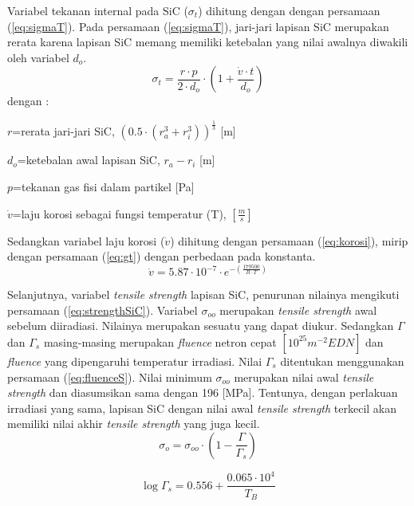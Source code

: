 \documentclass[a4paper,11pt]{report}
\begin{document}
Variabel tekanan internal pada SiC ($\sigma_t$) dihitung dengan dengan persamaan (\ref{eq:sigmaT}). Pada persamaan (\ref{eq:sigmaT}), jari-jari lapisan SiC merupakan rerata karena lapisan SiC memang memiliki ketebalan yang nilai awalnya diwakili oleh variabel $d_o$.
\begin{equation}
  \sigma_t =\frac{r \cdot p}{2 \cdot d_o} \cdot \left( 1+\frac{\dot{v} \cdot t}{d_o} \right)
  \label{eq:sigmaT}
\end{equation}
dengan :
\begin{description}
  \item $r$=rerata jari-jari SiC, $\left( 0.5 \cdot \left( r_a^3 + r_i^3 \right)\right)^{\frac{1}{3}}$ [m]
  \item $d_o$=ketebalan awal lapisan SiC, $r_a - r_i$ [m]
  \item $p$=tekanan gas fisi dalam partikel [Pa]
  \item $\dot{v}$=laju korosi sebagai fungsi temperatur (T), $\left[\frac{m}{s}\right]$
\end{description}

Sedangkan variabel laju korosi ($\dot{v}$) dihitung dengan persamaan (\ref{eq:korosi}), mirip dengan persamaan (\ref{eq:gt}) dengan perbedaan pada konstanta.
\begin{equation}
  \dot{v}=5.87 \cdot 10^{-7} \cdot e^{-\left( \frac{179500}{R \cdot T}\right)}
  \label{eq:korosi}
\end{equation}

Selanjutnya, variabel \textit{tensile strength} lapisan SiC, penurunan nilainya mengikuti persamaan (\ref{eq:strengthSiC}). Variabel $\sigma_{oo}$ merupakan \textit{tensile strength} awal sebelum diiradiasi. Nilainya merupakan sesuatu yang dapat diukur. Sedangkan $\Gamma$ dan $\Gamma_s$ masing-masing merupakan \textit{fluence} netron cepat $\left[ 10^{25}m^{-2} EDN\right]$ dan \textit{fluence} yang dipengaruhi temperatur irradiasi. Nilai $\Gamma_s$ ditentukan menggunakan persamaan (\ref{eq:fluenceS}). Nilai minimum $\sigma_{oo}$ merupakan nilai awal \textit{tensile strength} dan diasumsikan sama dengan 196 [MPa]. Tentunya, dengan perlakuan irradiasi yang sama, lapisan SiC dengan nilai awal \textit{tensile strength} terkecil akan memiliki nilai akhir \textit{tensile strength} yang juga kecil.
\begin{equation}
  \sigma_o = \sigma_{oo} \cdot \left( 1- \frac{\Gamma}{\Gamma_s} \right)
  \label{eq:strengthSiC}
\end{equation}

\begin{equation}
  \log \Gamma_s = 0.556 + \frac{0.065 \cdot 10^4}{T_B}
  \label{eq:fluenceS}
\end{equation}
\end{document}

